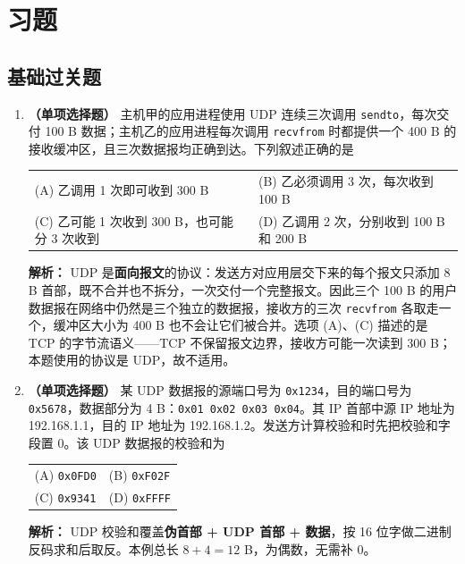 \section{习题}

\subsection{基础过关题}

\begin{enumerate}

\item \textbf{（单项选择题）} 主机甲的应用进程使用 UDP 连续三次调用 \texttt{sendto}，每次交付 100 B 数据；主机乙的应用进程每次调用 \texttt{recvfrom} 时都提供一个 400 B 的接收缓冲区，且三次数据报均正确到达。下列叙述正确的是
\begin{center}
\begin{tabular}{ll}
(A) 乙调用 1 次即可收到 300 B & (B) 乙必须调用 3 次，每次收到 100 B \\[4pt]
(C) 乙可能 1 次收到 300 B，也可能分 3 次收到 & (D) 乙调用 2 次，分别收到 100 B 和 200 B
\end{tabular}
\end{center}

\ifshowsolutions\par\noindent\textbf{解析：} UDP 是\textbf{面向报文}的协议：发送方对应用层交下来的每个报文只添加 8 B 首部，既不合并也不拆分，一次交付一个完整报文。因此三个 100 B 的用户数据报在网络中仍然是三个独立的数据报，接收方的三次 \texttt{recvfrom} 各取走一个，缓冲区大小为 400 B 也不会让它们被合并。选项 (A)、(C) 描述的是 TCP 的字节流语义——TCP 不保留报文边界，接收方可能一次读到 300 B；本题使用的协议是 UDP，故不适用。\else \answerarea \fi

\item \textbf{（单项选择题）} 某 UDP 数据报的源端口号为 \texttt{0x1234}，目的端口号为 \texttt{0x5678}，数据部分为 4 B：\texttt{0x01 0x02 0x03 0x04}。其 IP 首部中源 IP 地址为 192.168.1.1，目的 IP 地址为 192.168.1.2。发送方计算校验和时先把校验和字段置 0。该 UDP 数据报的校验和为
\begin{center}
\begin{tabular}{ll}
(A) \texttt{0x0FD0} & (B) \texttt{0xF02F} \\[4pt]
(C) \texttt{0x9341} & (D) \texttt{0xFFFF}
\end{tabular}
\end{center}

\ifshowsolutions\par\noindent\textbf{解析：} UDP 校验和覆盖\textbf{伪首部 + UDP 首部 + 数据}，按 16 位字做二进制反码求和后取反。本例总长 $8+4=12$ B，为偶数，无需补 0。


\end{enumerate}
